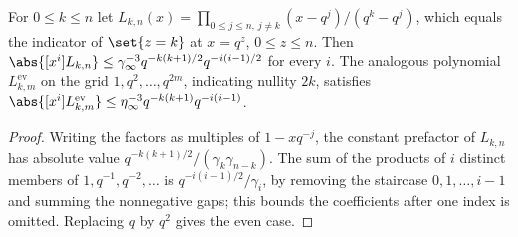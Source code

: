 \begin{lemma}\label{spn:lem:interpolation}
For $0\le k\le n$ let $L_{k,n}(x)=\prod_{0\le j\le n,\,j\ne k}(x-q^j)/(q^k-q^j)$, which equals the
indicator of $\set{z=k}$ at $x=q^z$, $0\le z\le n$. Then
$\abs{[x^i]L_{k,n}}\le\gamma_\infty^{-3}q^{-k(k+1)/2}q^{-i(i-1)/2}$ for every $i$. The analogous
polynomial $L^{\mathrm{ev}}_{k,m}$ on the grid $1,q^2,\dots,q^{2m}$, indicating nullity $2k$,
satisfies $\abs{[x^i]L^{\mathrm{ev}}_{k,m}}\le\eta_\infty^{-3}q^{-k(k+1)}q^{-i(i-1)}$.
\end{lemma}

\begin{proof}
Writing the factors as multiples of $1-xq^{-j}$, the constant prefactor of $L_{k,n}$ has
absolute value $q^{-k(k+1)/2}/(\gamma_k\gamma_{n-k})$. The sum of the products of $i$ distinct
members of $1,q^{-1},q^{-2},\dots$ is $q^{-i(i-1)/2}/\gamma_i$, by removing the staircase
$0,1,\dots,i-1$ and summing the nonnegative gaps; this bounds the coefficients after one index is
omitted. Replacing $q$ by $q^2$ gives the even case.
\end{proof}


